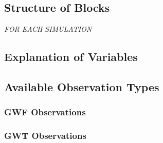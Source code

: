 

\subsection{Structure of Blocks}
\vspace{5mm}

\noindent \textit{FOR EACH SIMULATION}



\subsection{Explanation of Variables}
\begin{description}

\end{description}


\subsection{Available Observation Types}

\subsubsection{GWF Observations}


\subsubsection{GWT Observations}


